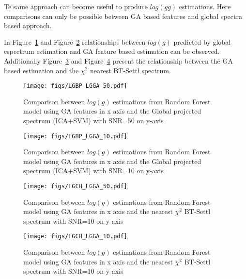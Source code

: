 {
Te same approach can become useful to produce $log(gg)$ estimations. 
Here comparisons can only be possible between GA based features and
global spectra based approach.

In Figure~\ref{fig:Gbp_Gga_50} and Figure~\ref{fig:Gbp_Gga_10} 
relationships between $log(g)$ predicted by global espectrum estimation 
and GA feature based estimation can be observed.
Additionally Figure~\ref{fig:Gch_Gga_50} and Figure~\ref{fig:Gch_Gga_10}
present the relationship between the GA based estimation and the 
$\chi^2$ nearest BT-Settl spectrum.

\begin {figure}
 \begin{center}
 \texttt{[image: figs/LGBP\_LGGA\_50.pdf]}
 \caption{Comparison between $log(g)$ estimations from 
 Random Forest model using GA features  in x axis and 
 the Global projected spectrum (ICA+SVM) with SNR=50 on y-axis}
 \label{fig:Gbp_Gga_50}
 \end{center}
\end {figure}

\begin {figure}
 \begin{center}
 \texttt{[image: figs/LGBP\_LGGA\_10.pdf]}
 \caption{Comparison between $log(g)$ estimations from 
 Random Forest model using GA features  in x axis and 
 the Global projected spectrum (ICA+SVM) with SNR=10 on y-axis}
 \label{fig:Gbp_Gga_10}
 \end{center}
\end {figure}

\begin {figure}
 \begin{center}
 \texttt{[image: figs/LGCH\_LGGA\_50.pdf]}
 \caption{Comparison between $log(g)$ estimations from 
 Random Forest model using GA features  in x axis and 
 the nearest $\chi^2$ BT-Settl spectrum with SNR=10 on y-axis}
 \label{fig:Gch_Gga_50}
 \end{center}
\end {figure}

\begin {figure}
 \begin{center}
 \texttt{[image: figs/LGCH\_LGGA\_10.pdf]}
 \caption{Comparison between $log(g)$ estimations from 
 Random Forest model using GA features  in x axis and 
 the nearest $\chi^2$ BT-Settl spectrum with SNR=10 on y-axis}
 \label{fig:Gch_Gga_10}
 \end{center}
\end {figure}


}

